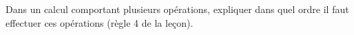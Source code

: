 \documentclass[exercice]{thedocument}%
\begin{document}
%
Dans un calcul comportant plusieurs opérations, expliquer dans quel ordre il
faut effectuer ces opérations (règle 4 de la leçon).
\dotedline\dotedline\dotedline\dotedline
\end{document}
